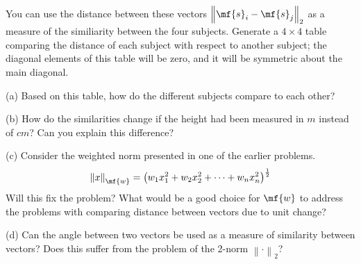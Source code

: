 \begin{enumerate}
    You can use the distance between these vectors $\left\lVert \mf{s}_i - \mf{s}_j\right\rVert_2$ as a measure of the similiarity between the four subjects. Generate a $4 \times 4$ table comparing the distance of each subject with respect to another subject; the diagonal elements of this table will be zero, and it will be symmetric about the main diagonal. 

    (a) Based on this table, how do the different subjects compare to each other?

    (b) How do the similarities change if the height had been measured in $m$ instead of $cm$? Can you explain this difference?

    (c) Consider the weighted norm presented in one of the earlier problems.  
    \[ \left\lVert x \right\rVert_\mf{w} = \left(w_1 x_1^2 + w_2 x_2^2 + \cdots + w_n x_n^2\right)^{\frac{1}{2}} \]
    Will this fix the problem? What would be a good choice for $\mf{w}$ to address the problems with comparing distance between vectors due to unit change?

    (d) Can the angle between two vectors be used as a measure of similarity between vectors? Does this suffer from the problem of the 2-norm $\left\lVert \cdot \right\rVert_2$?
\end{enumerate}



